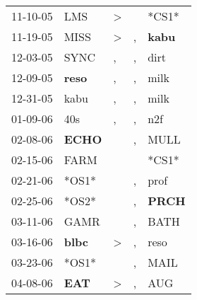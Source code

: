 \begin{supertabular}{p{0.07\textwidth}p{0.06\textwidth}p{0.02\textwidth}p{0.02\textwidth}p{0.06\textwidth}}
          11-10-05\textsuperscript{} &            LMS\textsuperscript{} &     \textgreater &                  &                            *CS1* \\
          11-19-05\textsuperscript{} &           MISS\textsuperscript{} &     \textgreater &                , &  \textbf{kabu\textsuperscript{}} \\
          12-03-05\textsuperscript{} &           SYNC\textsuperscript{} &                , &                , &           dirt\textsuperscript{} \\
          12-09-05\textsuperscript{} &  \textbf{reso\textsuperscript{}} &                , &                , &           milk\textsuperscript{} \\
          12-31-05\textsuperscript{} &           kabu\textsuperscript{} &                , &                , &           milk\textsuperscript{} \\
          01-09-06\textsuperscript{} &            40s\textsuperscript{} &                , &                , &            n2f\textsuperscript{} \\
          02-08-06\textsuperscript{} &  \textbf{ECHO\textsuperscript{}} &                  &                , &           MULL\textsuperscript{} \\
          02-15-06\textsuperscript{} &           FARM\textsuperscript{} &                  &                  &                            *CS1* \\
          02-21-06\textsuperscript{} &                            *OS1* &                  &                , &           prof\textsuperscript{} \\
          02-25-06\textsuperscript{} &                            *OS2* &                  &                , &  \textbf{PRCH\textsuperscript{}} \\
          03-11-06\textsuperscript{} &           GAMR\textsuperscript{} &                  &                , &           BATH\textsuperscript{} \\
          03-16-06\textsuperscript{} &  \textbf{blbc\textsuperscript{}} &     \textgreater &                , &           reso\textsuperscript{} \\
          03-23-06\textsuperscript{} &                            *OS1* &                  &                , &           MAIL\textsuperscript{} \\
          04-08-06\textsuperscript{} &   \textbf{EAT\textsuperscript{}} &     \textgreater &                , &            AUG\textsuperscript{} \\

\end{supertabular}
